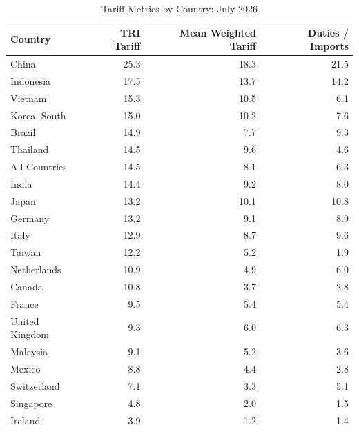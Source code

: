 \begin{table}
\centering
\caption{Tariff Metrics by Country: July 2026}
\label{tab:tariff_metrics}
\begin{tabular}{lrrr}
\toprule
Country & TRI Tariff & Mean Weighted Tariff & Duties / Imports \\
\midrule
China & 25.3 & 18.3 & 21.5 \\
Indonesia & 17.5 & 13.7 & 14.2 \\
Vietnam & 15.3 & 10.5 & 6.1 \\
Korea, South & 15.0 & 10.2 & 7.6 \\
Brazil & 14.9 & 7.7 & 9.3 \\
Thailand & 14.5 & 9.6 & 4.6 \\
All Countries & 14.5 & 8.1 & 6.3 \\
India & 14.4 & 9.2 & 8.0 \\
Japan & 13.2 & 10.1 & 10.8 \\
Germany & 13.2 & 9.1 & 8.9 \\
Italy & 12.9 & 8.7 & 9.6 \\
Taiwan & 12.2 & 5.2 & 1.9 \\
Netherlands & 10.9 & 4.9 & 6.0 \\
Canada & 10.8 & 3.7 & 2.8 \\
France & 9.5 & 5.4 & 5.4 \\
United Kingdom & 9.3 & 6.0 & 6.3 \\
Malaysia & 9.1 & 5.2 & 3.6 \\
Mexico & 8.8 & 4.4 & 2.8 \\
Switzerland & 7.1 & 3.3 & 5.1 \\
Singapore & 4.8 & 2.0 & 1.5 \\
Ireland & 3.9 & 1.2 & 1.4 \\
\bottomrule
\end{tabular}
\end{table}
